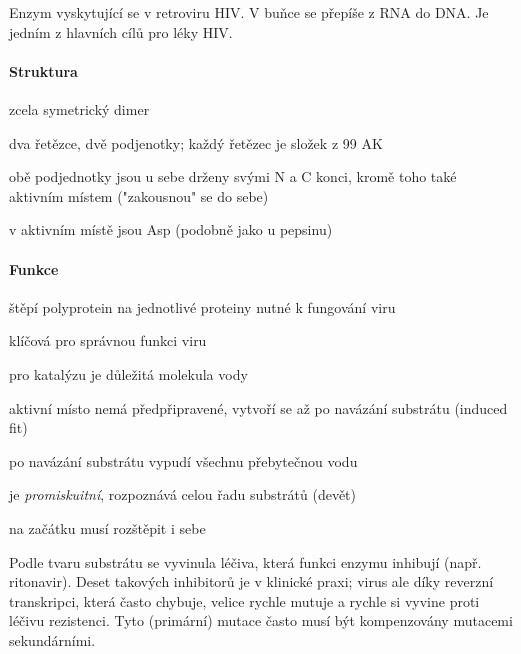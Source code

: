 \documentclass[DIV=8]{scrreprt}
\begin{document}
Enzym vyskytující se v retroviru HIV. V buňce se přepíše z RNA do DNA. Je jedním z hlavních cílů pro léky HIV.

\paragraph{Struktura}
\begin{myItemize}[nosep]
    \item zcela symetrický dimer
    \item dva řetězce, dvě podjenotky; každý řetězec je složek z 99 AK
    \item obě podjednotky jsou u sebe drženy svými N a C konci, kromě toho také aktivním místem ("zakousnou" se do sebe)
    \item v aktivním místě jsou Asp (podobně jako u pepsinu)
\end{myItemize}



\paragraph{Funkce}
\begin{myItemize}[nosep]
    \item štěpí polyprotein na jednotlivé proteiny nutné k fungování viru
\begin{myItemize}[nosep]
    \item klíčová pro správnou funkci viru
\end{myItemize}

    \item pro katalýzu je důležitá molekula vody
    \item aktivní místo nemá předpřipravené, vytvoří se až po navázání substrátu (induced fit)
\begin{myItemize}[nosep]
    \item po navázání substrátu vypudí všechnu přebytečnou vodu
\end{myItemize}

    \item je \emph{promiskuitní}, rozpoznává celou řadu substrátů (devět)
    \item na začátku musí rozštěpit i sebe
\end{myItemize}



Podle tvaru substrátu se vyvinula léčiva, která funkci enzymu inhibují (např. ritonavir). Deset takových inhibitorů je v klinické praxi; virus ale díky reverzní transkripci, která často chybuje, velice rychle mutuje a rychle si vyvine proti léčivu rezistenci. Tyto (primární) mutace často musí být kompenzovány mutacemi sekundárními.
\end{document}
